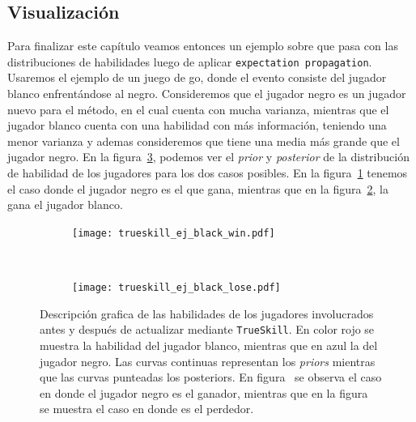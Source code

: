 \documentclass[11pt,twoside,spanish]{report} %
\begin{document}
\subsection{Visualizaci\'on}

Para finalizar este cap\'itulo veamos entonces un ejemplo sobre que pasa con las distribuciones de habilidades luego de aplicar \texttt{expectation propagation}.
Usaremos el ejemplo de un juego de go, donde el evento consiste del jugador blanco enfrent\'andose al negro.
Consideremos que el jugador negro es un jugador nuevo para el m\'etodo, en el cual cuenta con mucha varianza, mientras que el jugador blanco cuenta con una habilidad con m\'as informaci\'on, teniendo una menor varianza y ademas consideremos que tiene una media m\'as grande que el jugador negro.
En la figura~\ref{fig:ejTrue}, podemos ver el \textit{prior} y \textit{posterior} de la distribuci\'on de habilidad de los jugadores para los dos casos posibles.
En la figura~\ref{fig:ejTrueWin} tenemos el caso donde el jugador negro es el que gana, mientras que en la figura~\ref{fig:ejTrueLose}, la gana el jugador blanco.

\begin{figure}[H]
	\centering
	\begin{subfigure}[t]{.49\textwidth}
		\centering
	\texttt{[image: trueskill\_ej\_black\_win.pdf]}
	\caption{}
	\label{fig:ejTrueWin}
	\end{subfigure}
 	~
	\begin{subfigure}[t]{.49\textwidth}
		\centering
	\texttt{[image: trueskill\_ej\_black\_lose.pdf]}
	\caption{}
	\label{fig:ejTrueLose}
\end{subfigure}
	\caption{Descripci\'on grafica de las habilidades de los jugadores involucrados antes y despu\'es de actualizar mediante \texttt{TrueSkill}. En color rojo se muestra la habilidad del jugador blanco, mientras que en azul la del jugador negro. Las curvas continuas representan los \textit{priors} mientras que las curvas punteadas los posteriors. En figura~ se observa el caso en donde el jugador negro es el ganador, mientras que en la figura~ se muestra el caso en donde es el perdedor.}
\label{fig:ejTrue}
\end{figure}
\end{document}
